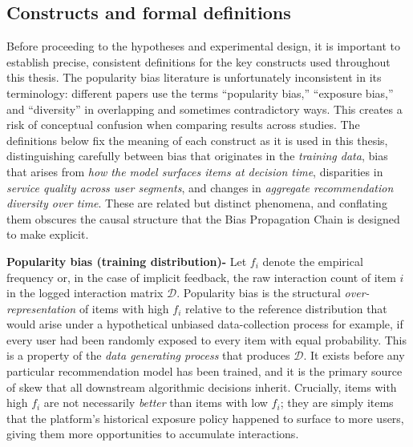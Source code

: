 \documentclass[11pt,a4paper]{report}
\begin{document}
\subsection{Constructs and formal definitions}
\label{sec:lit_theory_constructs}

Before proceeding to the hypotheses and experimental design, it is important to establish precise, consistent definitions for the key constructs used throughout this thesis. The popularity bias literature is unfortunately inconsistent in its terminology: different papers use the terms ``popularity bias,'' ``exposure bias,'' and ``diversity'' in overlapping and sometimes contradictory ways. This creates a risk of conceptual confusion when comparing results across studies. The definitions below fix the meaning of each construct as it is used in this thesis, distinguishing carefully between bias that originates in the \emph{training data}, bias that arises from \emph{how the model surfaces items at decision time}, disparities in \emph{service quality across user segments}, and changes in \emph{aggregate recommendation diversity over time}. These are related but distinct phenomena, and conflating them obscures the causal structure that the Bias Propagation Chain is designed to make explicit.

\textbf{Popularity bias (training distribution)-}
Let $f_i$ denote the empirical frequency or, in the case of implicit feedback, the raw interaction count of item $i$ in the logged interaction matrix $\mathcal{D}$. Popularity bias is the structural \emph{over-representation} of items with high $f_i$ relative to the reference distribution that would arise under a hypothetical unbiased data-collection process for example, if every user had been randomly exposed to every item with equal probability. This is a property of the \emph{data generating process} that produces $\mathcal{D}$. It exists before any particular recommendation model has been trained, and it is the primary source of skew that all downstream algorithmic decisions inherit. Crucially, items with high $f_i$ are not necessarily \emph{better} than items with low $f_i$; they are simply items that the platform's historical exposure policy happened to surface to more users, giving them more opportunities to accumulate interactions.
\end{document}
